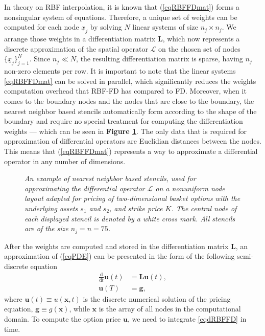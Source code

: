 \documentclass{UUThesisTemplate}
\begin{document}
In theory on RBF interpolation, it is known that (\ref{eqRBFFDmat}) forms a nonsingular system of equations. Therefore, a unique set of weights can be computed for each node $\underline{x}_j$ by solving $N$ linear systems of size $n_j\times n_j$. We arrange those weights in a differentiation matrix $\mathbf{L}$, which now represents a discrete approximation of the spatial operator $\mathcal{L}$ on the chosen set of nodes $\{\underline{x}_j\}_{j=1}^N$. Since $n_j \ll N$, the resulting differentiation matrix is sparse, having $n_j$ non-zero elements per row. It is important to note that the linear systems \eqref{eqRBFFDmat} can be solved in parallel, which significantly reduces the weights computation overhead that RBF-FD has compared to FD. Moreover, when it comes to the boundary nodes and the nodes that are close to the boundary, the nearest neighbor based stencils automatically form according to the shape of the boundary and require no special treatment for computing the differentiation weights --- which can be seen in \textbf{Figure \ref{fig:gridsten}}. The only data that is required for approximation of differential operators are Euclidian distances between the nodes. This means that (\ref{eqRBFFDmat}) represents a way to approximate a differential operator in any number of dimensions.

\begin{figure}[H]
\centering

\caption{\emph{An example of nearest neighbor based stencils, used for approximating the differential operator $\mathcal{L}$ on a nonuniform node layout adapted for pricing of two-dimensional basket options with the underlying assets $s_1$ and $s_2$, and strike price $K$. The central node of each displayed stencil is denoted by a white cross mark. All stencils are of the size $n_j=n=75$.}}
\label{fig:gridsten}
\end{figure}

\par
After the weights are computed and stored in the differentiation matrix $\mathbf{L}$, an approximation of (\ref{eqPDE}) can be presented in the form of the following semi-discrete equation
\begin{align}
\label{eqdRBFFD}
\frac{\mathrm{d}}{\mathrm{d} t}\mathbf{u}(t)&=\mathbf{L}\mathbf{u}(t),\\
\mathbf{u}(T)&=\mathbf{g},
\end{align}
where $\mathbf{u}(t)\equiv u(\mathbf{x},t)$ is the discrete numerical solution of the pricing equation, $\mathbf{g}\equiv g(\mathbf{x})$, while $\mathbf{x}$ is the array of all nodes in the computational domain. To compute the option price $\mathbf{u}$, we need to integrate \eqref{eqdRBFFD} in time. 
\end{document}
